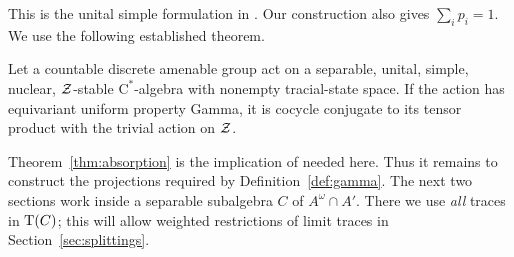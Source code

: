 This is the unital simple formulation in
\cite[Definition~A]{SzaboWouters2025}.
Our construction also gives \(\sum_i p_i=1\).
We use the following established theorem.

\begin{theorem}\label{thm:absorption}
Let a countable discrete amenable group act on a separable, unital,
simple, nuclear, \(\mathcal Z\)-stable \(\mathrm C^*\)-algebra with
nonempty tracial-state space. If the action has equivariant uniform
property Gamma, it is cocycle conjugate to its tensor product with
the trivial action on \(\mathcal Z\).
\end{theorem}

Theorem~\ref{thm:absorption} is the implication of
\cite[Corollary~C]{SzaboWouters2025} needed here.
Thus it remains to construct the projections required by Definition~\ref{def:gamma}.
The next two sections work inside a separable subalgebra \(C\) of
\(A^\omega\cap A'\). There we use \emph{all} traces in \(\operatorname{T}(C)\);
this will allow weighted restrictions of limit traces in
Section~\ref{sec:splittings}.
